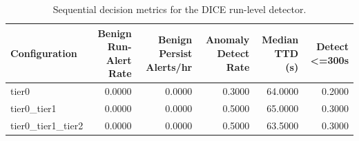 \begin{table}[t]
\centering
\caption{Sequential decision metrics for the DICE run-level detector.}
\label{tab:dice_sequential_metrics}
\footnotesize
\begin{tabular}{lrrrrr}
\toprule
Configuration & Benign Run-Alert Rate & Benign Persist Alerts/hr & Anomaly Detect Rate & Median TTD (s) & Detect <=300s \\
\midrule
tier0 & 0.0000 & 0.0000 & 0.3000 & 64.0000 & 0.2000 \\
tier0_tier1 & 0.0000 & 0.0000 & 0.5000 & 65.0000 & 0.3000 \\
tier0_tier1_tier2 & 0.0000 & 0.0000 & 0.5000 & 63.5000 & 0.3000 \\
\bottomrule
\end{tabular}

\end{table}
